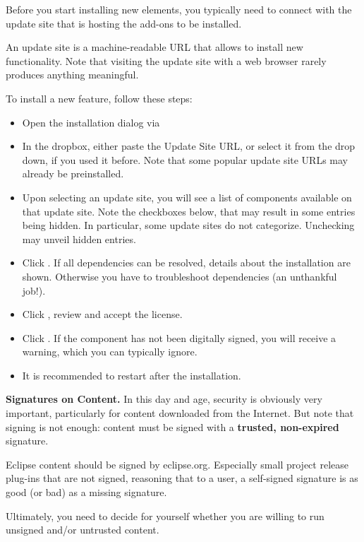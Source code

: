 Before you start installing new elements, you typically need to connect with the update site that is hosting the add-ons to be installed.

\begin{definition}
An update site is a machine-readable URL that allows \pror{} to install new functionality.  Note that visiting the update site with a web browser rarely produces anything meaningful.
\end{definition}

To install a new feature, follow these steps:

\begin{itemize}
\item Open the installation dialog via 
\item In the  dropbox, either paste the Update Site URL, or select it from the drop down, if you used it before.  Note that some popular update site URLs may already be preinstalled.
\item Upon selecting an update site, you will see a list of components available on that update site.  Note the checkboxes below, that may result in some entries being hidden.  In particular, some update sites do not categorize.  Unchecking  may unveil hidden entries.
\item Click .  If all dependencies can be resolved, details about the installation are shown.  Otherwise you have to troubleshoot dependencies (an unthankful job!).
\item Click , review and accept the license.
\item Click .  If the component has not been digitally signed, you will receive a warning, which you can typically ignore.
\item It is recommended to restart after the installation.
\end{itemize}

\begin{info}
\textbf{Signatures on Content.}  In this day and age, security is obviously very important, particularly for content downloaded from the Internet.  But note that signing is not enough: content must be signed with a \textbf{trusted, non-expired} signature.

Eclipse content should be signed by eclipse.org.  Especially small project release plug-ins that are not signed, reasoning that to a user, a self-signed signature is as good (or bad) as a missing signature.

Ultimately, you need to decide for yourself whether you are willing to run unsigned and/or untrusted content.
\end{info}


